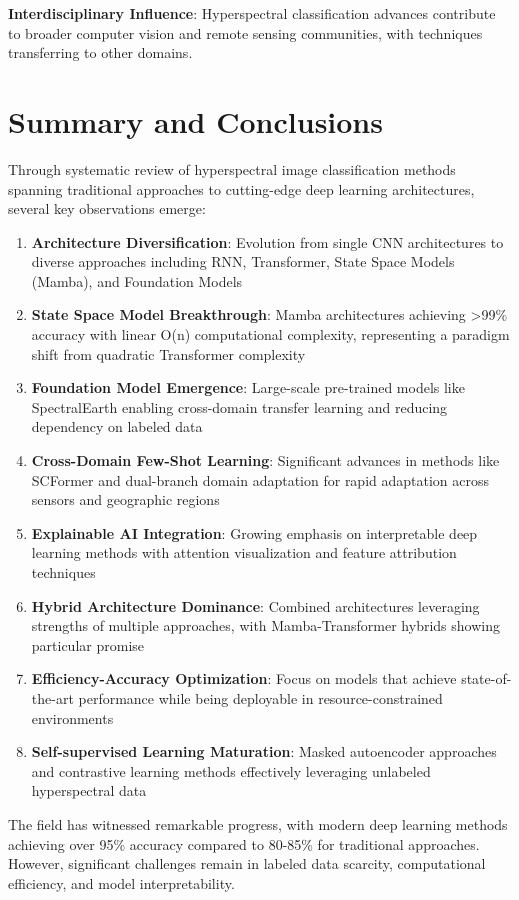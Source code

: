 \documentclass[journal]{IEEEtran}
\begin{document}
\textbf{Interdisciplinary Influence}: Hyperspectral classification advances contribute to broader computer vision and remote sensing communities, with techniques transferring to other domains.

\section{Summary and Conclusions}

Through systematic review of hyperspectral image classification methods spanning traditional approaches to cutting-edge deep learning architectures, several key observations emerge:

\begin{enumerate}
\item \textbf{Architecture Diversification}: Evolution from single CNN architectures to diverse approaches including RNN, Transformer, State Space Models (Mamba), and Foundation Models
\item \textbf{State Space Model Breakthrough}: Mamba architectures achieving >99\% accuracy with linear O(n) computational complexity, representing a paradigm shift from quadratic Transformer complexity
\item \textbf{Foundation Model Emergence}: Large-scale pre-trained models like SpectralEarth enabling cross-domain transfer learning and reducing dependency on labeled data
\item \textbf{Cross-Domain Few-Shot Learning}: Significant advances in methods like SCFormer and dual-branch domain adaptation for rapid adaptation across sensors and geographic regions
\item \textbf{Explainable AI Integration}: Growing emphasis on interpretable deep learning methods with attention visualization and feature attribution techniques
\item \textbf{Hybrid Architecture Dominance}: Combined architectures leveraging strengths of multiple approaches, with Mamba-Transformer hybrids showing particular promise
\item \textbf{Efficiency-Accuracy Optimization}: Focus on models that achieve state-of-the-art performance while being deployable in resource-constrained environments
\item \textbf{Self-supervised Learning Maturation}: Masked autoencoder approaches and contrastive learning methods effectively leveraging unlabeled hyperspectral data
\end{enumerate}

The field has witnessed remarkable progress, with modern deep learning methods achieving over 95\% accuracy compared to 80-85\% for traditional approaches. However, significant challenges remain in labeled data scarcity, computational efficiency, and model interpretability.
\end{document}
